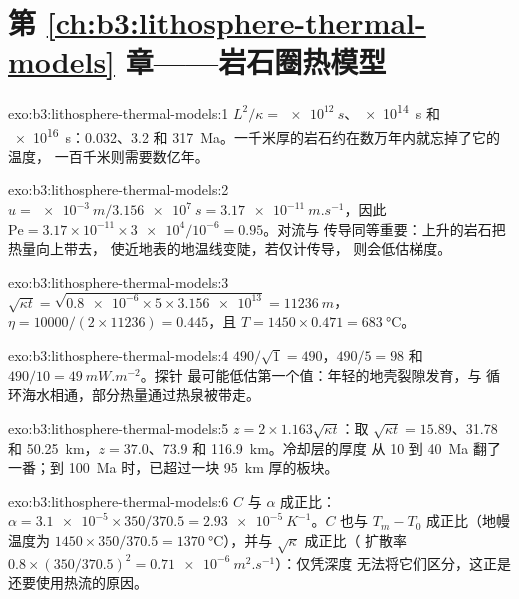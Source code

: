 \section*{第 \ref{ch:b3:lithosphere-thermal-models} 章——岩石圈热模型}

\begin{solution}{exo:b3:lithosphere-thermal-models:1}
$L^2/\kappa = \qty{e12}{s}$、\qty{e14}{s} 和 \qty{e16}{s}：0.032、3.2 和
\qty{317}{Ma}。一千米厚的岩石约在数万年内就忘掉了它的温度，
一百千米则需要数亿年。
\end{solution}

\begin{solution}{exo:b3:lithosphere-thermal-models:2}
$u = \qty{e-3}{m}/\qty{3.156e7}{s} = \qty{3.17e-11}{m.s^{-1}}$，因此
$\mathrm{Pe} = 3.17\times10^{-11}\times\num{3e4}/10^{-6} = 0.95$。对流与
传导同等重要：上升的岩石把热量向上带去，
使近地表的地温线变陡，若仅计传导，
则会低估梯度。
\end{solution}

\begin{solution}{exo:b3:lithosphere-thermal-models:3}
$\sqrt{\kappa t} = \sqrt{\num{0.8e-6}\times5\times\num{3.156e13}} =
\qty{11236}{m}$，$\eta = 10000/(2\times11236) = 0.445$，且 $T = 1450\times0.471
= \qty{683}{\celsius}$。
\end{solution}

\begin{solution}{exo:b3:lithosphere-thermal-models:4}
$490/\sqrt1 = 490$，$490/5 = 98$ 和 $490/10 = \qty{49}{mW.m^{-2}}$。探针
最可能低估第一个值：年轻的地壳裂隙发育，与
循环海水相通，部分热量通过热泉被带走。
\end{solution}

\begin{solution}{exo:b3:lithosphere-thermal-models:5}
$z = 2\times1.163\sqrt{\kappa t}$：取 $\sqrt{\kappa t} = 15.89$、31.78 和
\qty{50.25}{km}，$z = 37.0$、73.9 和 \qty{116.9}{km}。冷却层的厚度
从 10 到 \qty{40}{Ma} 翻了一番；到 \qty{100}{Ma} 时，已超过一块
\qty{95}{km} 厚的板块。
\end{solution}

\begin{solution}{exo:b3:lithosphere-thermal-models:6}
$C$ 与 $\alpha$ 成正比：$\alpha = \num{3.1e-5}\times350/370.5 =
\qty{2.93e-5}{K^{-1}}$。$C$ 也与 $T_m - T_0$ 成正比（地幔温度为
$1450\times350/370.5 = \qty{1370}{\celsius}$），并与 $\sqrt\kappa$ 成正比（
扩散率 $0.8\times(350/370.5)^2 = \qty{0.71e-6}{m^2.s^{-1}}$）：仅凭深度
无法将它们区分，这正是还要使用热流的原因。
\end{solution}

